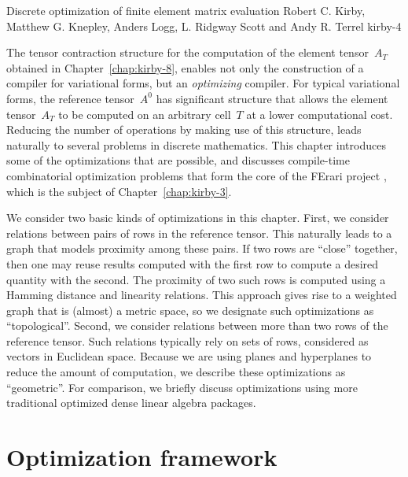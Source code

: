               {Discrete optimization of finite element matrix evaluation}
              {Robert C. Kirby, Matthew G. Knepley, Anders Logg, L. Ridgway Scott and Andy R. Terrel}
              {kirby-4}

The tensor contraction structure for the computation of the element
tensor~$A_T$ obtained in Chapter~\ref{chap:kirby-8}, enables not only the
construction of a compiler for variational forms, but an \emph{optimizing}
compiler. For typical variational forms, the reference tensor~$A^0$ has
significant structure that allows the element tensor~$A_T$ to be computed
on an arbitrary cell~$T$ at a lower computational cost. Reducing the
number of operations by making use of this structure, leads naturally
to several problems in discrete mathematics. This chapter introduces
some of the optimizations that are possible, and discusses compile-time
combinatorial optimization problems that form the core of the FErari
project \citep{KirbyLoggScottEtAl2006,KirbyScott2007,KirbyLogg2008},
which is the subject of Chapter~\ref{chap:kirby-3}.

We consider two basic kinds of optimizations in this chapter. First,
we consider relations between pairs of rows in the reference tensor.
This naturally leads to a graph that models proximity among these pairs.
If two rows are ``close'' together, then one may reuse results computed
with the first row to compute a desired quantity with the second.
The proximity of two such rows is computed using a Hamming distance
and linearity relations. This approach gives rise to a weighted graph
that is (almost) a metric space, so we designate such optimizations
as ``topological''.  Second, we consider relations between more than
two rows of the reference tensor. Such relations typically rely on
sets of rows, considered as vectors in Euclidean space. Because we
are using planes and hyperplanes to reduce the amount of computation,
we describe these optimizations as ``geometric''. For comparison, we
briefly discuss optimizations using more traditional optimized dense
linear algebra packages.

\section{Optimization framework}

